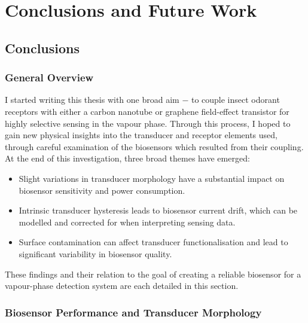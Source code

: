\documentclass[
  letterpaper,
  DIV=11,
  numbers=noendperiod]{scrartcl}
\author{}
\date{}
\begin{document}
\ifdefined\Shaded\renewenvironment{Shaded}{\begin{tcolorbox}[sharp corners, frame hidden, interior hidden, borderline west={3pt}{0pt}{shadecolor}, breakable, enhanced, boxrule=0pt]}{\end{tcolorbox}}\fi

\hypertarget{conclusions-and-future-work}{%
\section{Conclusions and Future
Work}\label{conclusions-and-future-work}}

\hypertarget{sec-conclusions}{%
\subsection{Conclusions}\label{sec-conclusions}}

\hypertarget{general-overview}{%
\subsubsection{General Overview}\label{general-overview}}

I started writing this thesis with one broad aim \(-\) to couple insect
odorant receptors with either a carbon nanotube or graphene field-effect
transistor for highly selective sensing in the vapour phase. Through
this process, I hoped to gain new physical insights into the transducer
and receptor elements used, through careful examination of the
biosensors which resulted from their coupling. At the end of this
investigation, three broad themes have emerged:

\begin{itemize}
\item
  Slight variations in transducer morphology have a substantial impact
  on biosensor sensitivity and power consumption.
\item
  Intrinsic transducer hysteresis leads to biosensor current drift,
  which can be modelled and corrected for when interpreting sensing
  data.
\item
  Surface contamination can affect transducer functionalisation and lead
  to significant variability in biosensor quality.
\end{itemize}

These findings and their relation to the goal of creating a reliable
biosensor for a vapour-phase detection system are each detailed in this
section.

\hypertarget{biosensor-performance-and-transducer-morphology}{%
\subsubsection{Biosensor Performance and Transducer
Morphology}\label{biosensor-performance-and-transducer-morphology}}
\end{document}
